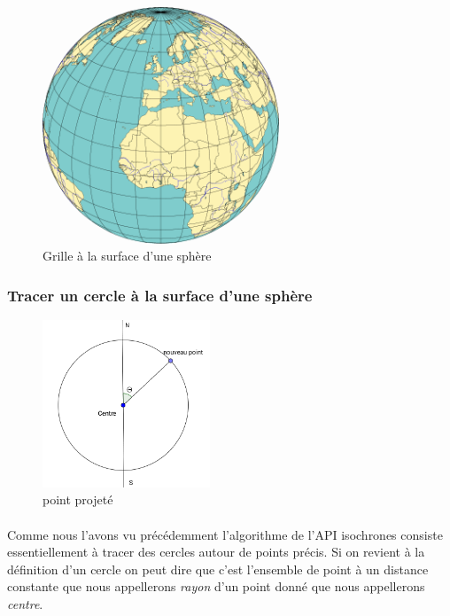 \documentclass[a4paper]{report}
\begin{document}
\begin{figure}[H]
	\begin{center}
		\includegraphics[width=200pt]{image/grille_sphere}
		\caption{Grille à la surface d'une sphère}
		\label{Grille à la surface d'une sphère}
	\end{center}
\end{figure}

\subsubsection{Tracer un cercle à la surface d'une sphère}

\begin{figure}
		\includegraphics[width=5cm]{image/proj}
		\caption{point projeté}
		\label{point projeté}
\end{figure}

\paragraph{} Comme nous l'avons vu précédemment l'algorithme de l'API isochrones consiste essentiellement à tracer des cercles autour de points précis. Si on revient à la définition d'un cercle on peut dire que c'est l'ensemble de point à un distance constante que nous appellerons \emph{rayon} d'un point donné que nous appellerons \emph{centre}.
\end{document}
